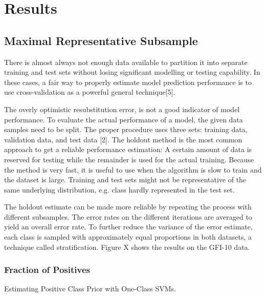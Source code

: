 \chapter{Results}\label{Sec:Results}

\section{Maximal Representative Subsample}
 
There is almost always not enough data available to partition it into separate training and test sets without losing signiﬁcant modelling or testing capability. In these cases, a fair way to properly estimate model prediction performance is to use cross-validation as a powerful general technique[5].

The overly optimistic resubstitution error, is not a good indicator of model performance. To evaluate the actual performance of a model, the given data samples need to be split. The proper procedure uses three sets: training data, validation data, and test data [2]. The holdout method is the most common approach to get a reliable performance estimation: A certain amount of data is reserved for testing while the remainder is used for the actual training. Because the method is very fast, it is useful to use when the algorithm is slow to train and the dataset is large. Training and test sets might not be representative of the same underlying distribution, e.g. class hardly represented in the test set.

The holdout estimate can be made more reliable by repeating the process with different subsamples. The error rates on the different iterations are averaged to yield an overall error rate. To further reduce the variance of the error estimate, each class is sampled with approximately equal proportions in both datasets, a technique called stratiﬁcation. Figure X shows the results on the GFI-10 data.

\subsection{Fraction of Positives}

Estimating Positive Class Prior with One-Class SVMs.

